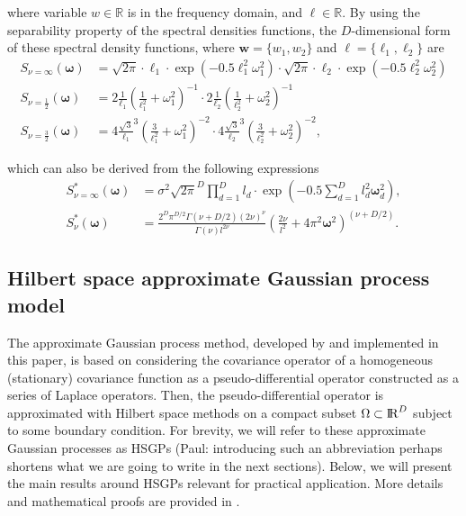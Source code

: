 \documentclass[]{interact}
\theoremstyle{plain}%
\theoremstyle{definition}
\theoremstyle{remark}
\begin{document}
\noindent where variable $w\in \mathbb{R}$ is in the frequency domain, and $\ell\in \mathbb{R}$. By using the separability property of the spectral densities functions, the $D$-dimensional form of these spectral density functions, where $\mathbf{w}=\{w_1,w_2\}$ and $\mathbf{\ell}=\{\ell_1,\ell_2\}$ are
%
\begin{align}\label{eq:specdens_multi}
S_{\nu=\infty}(\bm{\omega})&= \sqrt{2\pi} \cdot \ell_1 \cdot \exp\left(-0.5 \ell_1^2 \omega_1^2\right) \cdot  \sqrt{2\pi} \cdot \ell_2 \cdot \exp\left(-0.5 \ell_2^2 \omega_2^2\right) \\
S_{\nu=\frac{1}{2}}(\bm{\omega})&= 2 \frac{1}{\ell_1}\left(\frac{1}{\ell_1^2} + \omega_1^2\right)^{-1} \cdot 2 \frac{1}{\ell_2}\left(\frac{1}{\ell_2^2} + \omega_2^2\right)^{-1} \\
S_{\nu=\frac{3}{2}}(\bm{\omega})&= 4 \frac{\sqrt{3}}{\ell_1}^{3}\left(\frac{3}{\ell_1^2} + \omega_1^2\right)^{-2} \cdot 4 \frac{\sqrt{3}}{\ell_2}^{3}\left(\frac{3}{\ell_2^2} + \omega_2^2\right)^{-2},
\end{align}

\noindent which can also be derived from the following expressions \citep{rasmussen2006gaussian}
%
\begin{align*}
S^{\ast}_{\nu=\infty}(\mathbf{\omega})&= \sigma^2 \sqrt{2\pi}^D \prod_{d=1}^D l_d \cdot \exp\left(-0.5 \sum_{d=1}^D l_d^2 \mathbf{\omega}_d^2\right), \\
%
S^{\ast}_{\nu}(\mathbf{\omega})&= \frac{2^D\pi^{D/2}\Gamma(\nu+D/2)(2\nu)^{\nu}}{\Gamma(\nu)l^{2\nu}}\left(\frac{2\nu}{l^2}+4\pi^2\mathbf{\omega}^2 \right)^{(\nu+D/2)}.
\end{align*}

\subsection{Hilbert space approximate Gaussian process model}

The approximate Gaussian process method, developed by \cite{solin2018hilbert} and implemented in this paper, is based on considering the covariance operator of a homogeneous (stationary) covariance function as a pseudo-differential operator constructed as a series of Laplace operators. Then, the pseudo-differential operator is approximated with Hilbert space methods on a compact subset $\Omega \subset {\rm I\!R}^D$ subject to some boundary condition. For brevity, we will refer to these approximate Gaussian processes as HSGPs (Paul: introducing such an abbreviation perhaps shortens what we are going to write in the next sections). Below, we will present the main results around HSGPs relevant for practical application. More details and mathematical proofs are provided in \cite{solin2018hilbert}.
\end{document}
